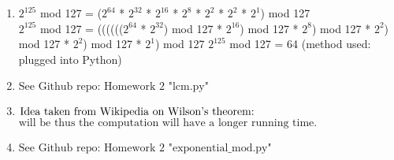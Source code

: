 \documentclass{article}
\begin{document}
\begin{enumerate}
	\item $2^{125}$ mod 127 = ($2^{64}$ * $2^{32}$ * $2^{16}$ * $2^{8}$ * $2^{2}$ * $2^{2}$ * $2^{1}$) mod 127 \\
		$2^{125}$ mod 127 = (((((($2^{64}$ * $2^{32}$) mod 127 * $2^{16}$) mod 127 * $2^{8}$) mod 127 * $2^{2}$) mod 127 * $2^{2}$) mod 127 * $2^{1}$) mod 127
		$2^{125}$ mod 127 = 64 (method used: plugged into Python) 
		\\
	
	\item $ \text {See Github repo: Homework 2 "lcm.py"} $
		\\
	
	\item $ \text{Idea taken from Wikipedia on Wilson's theorem:} \\
		$  \\ 
		$ \text{will be thus the computation will have a longer running time.}$
		\\
	
	\item $ \text {See Github repo: Homework 2 "exponential$\_$mod.py"} $
		\\
	
\end{enumerate}
\end{document}
